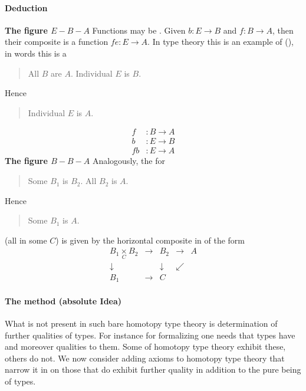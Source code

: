 \documentclass[12pt,titlepage]{article}
\newcommand{\itexarray}[1]{\begin{matrix}#1\end{matrix}}
\theoremstyle{plain}
\theoremstyle{definition}
\theoremstyle{remark}
\begin{document}
\hypertarget{deduction}{}\paragraph*{{Deduction}}\label{deduction}
\textbf{The figure $E-B-A$}
Functions may be . Given $b \colon E \to B$ and $f \colon B \to A$, then their composite is a function $f e \colon E \to A$. In type theory this is an example of  (), in words this is a 
\begin{quote}%
All $B$ are $A$.
Individual $E$ is $B$.
\end{quote}
Hence
\begin{quote}%
Individual $E$ is $A$.
\end{quote}
\begin{displaymath}
\begin{aligned}
f & \colon B \longrightarrow A
\\
b & \colon E \longrightarrow B
\\
f b & \colon E \longrightarrow A
\end{aligned}
\end{displaymath}
\textbf{The figure $B-B-A$}
Analogously, the  for
\begin{quote}%
Some $B_1$ is $B_2$.
All $B_2$ is $A$.
\end{quote}
Hence
\begin{quote}%
Some $B_1$ is $A$.
\end{quote}
(all in some  $C$) is given by the horizontal composite in  of the form
\begin{displaymath}
\itexarray{
B_1 \underset{C}{\times} B_2 &\longrightarrow& B_2 &\longrightarrow& A
\\
\downarrow && \downarrow & \swarrow
\\
B_1 &\longrightarrow& C
}
\end{displaymath}
\hypertarget{the_method_absolute_idea}{}\paragraph*{{The method (absolute Idea)}}\label{the_method_absolute_idea}
What is not present in such bare homotopy type theory is determination of further qualities of types. For instance for  formalizing  one needs that types have  and moreover  qualities to them. Some  of homotopy type theory exhibit these, others do not. We now consider adding axioms to homotopy type theory that narrow it in on those  that do exhibit further quality in addition to the pure being of types.
\end{document}
